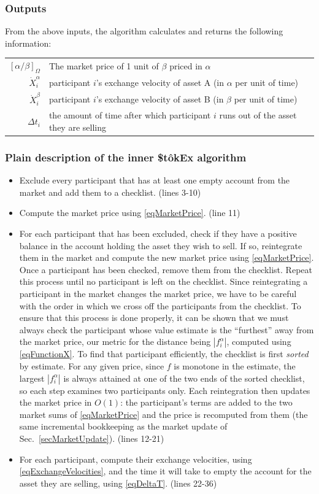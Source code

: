 \documentclass[letterpaper]{article}
\newcommand{\StokEx}{\$t\^{o}kEx}
\begin{document}
\subsubsection{Outputs}
From the above inputs, the algorithm calculates and returns the following information:

\begin{tabularx}{\textwidth}{rX}
 $[\alpha/\beta]_\Omega$ & The market price of 1 unit of $\beta$ priced in $\alpha$ \\
$\dot{X}^\alpha_i$ & participant $i$'s exchange velocity of asset A (in $\alpha$ per unit of time)\\
$\dot{X}^\beta_i$ & participant $i$'s exchange velocity of asset B (in $\beta$ per unit of time) \\
$\Delta t_i$ & the amount of time after which participant $i$ runs out of the asset they are selling
\end{tabularx}

\subsubsection{Plain description of the inner \StokEx{} algorithm}
\begin{itemize}
    \item Exclude every participant that has at least one empty account from the market and add them to a checklist. (lines 3-10)
    \item Compute the market price using \eqref{eqMarketPrice}. (line 11)
    \item For each participant that has been excluded, check if they have a positive balance in the account holding the asset they wish to sell. If so, reintegrate them in the market and compute the new market price using \eqref{eqMarketPrice}. Once a participant has been checked, remove them from the checklist. Repeat this process until no participant is left on the checklist. Since reintegrating a participant in the market changes the market price, we have to be careful with the order in which we cross off the participants from the checklist. To ensure that this process is done properly, it can be shown that we must always check the participant whose value estimate is the ``furthest'' away from the market price, our metric for the distance being $|f_i^\alpha|$, computed using \eqref{eqFunctionX}. To find that participant efficiently, the checklist is first \emph{sorted} by estimate. For any given price, since $f$ is monotone in the estimate, the largest $|f_i^\alpha|$ is always attained at one of the two ends of the sorted checklist, so each step examines two participants only. Each reintegration then updates the market price in $O(1)$: the participant's terms are added to the two market sums of \eqref{eqMarketPrice} and the price is recomputed from them (the same incremental bookkeeping as the market update of Sec.~\ref{secMarketUpdate}). (lines 12-21)
    \item For each participant, compute their exchange velocities, using \eqref{eqExchangeVelocities}, and the time it will take to empty the account for the asset they are selling, using \eqref{eqDeltaT}. (lines 22-36)
\end{itemize}
\end{document}
